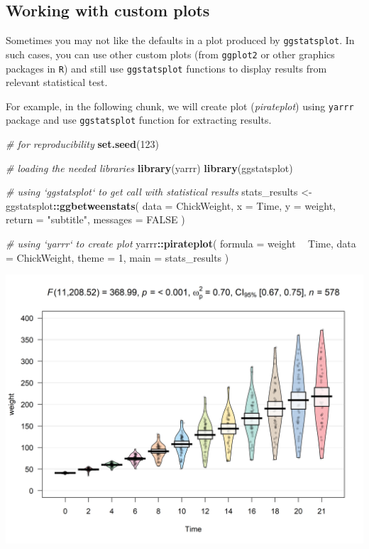 \documentclass[]{article}
\newenvironment{Shaded}{\begin{snugshade}}{\end{snugshade}}
\newcommand{\CommentTok}[1]{\textcolor[rgb]{0.56,0.35,0.01}{\textit{#1}}}
\newcommand{\DataTypeTok}[1]{\textcolor[rgb]{0.13,0.29,0.53}{#1}}
\newcommand{\DecValTok}[1]{\textcolor[rgb]{0.00,0.00,0.81}{#1}}
\newcommand{\KeywordTok}[1]{\textcolor[rgb]{0.13,0.29,0.53}{\textbf{#1}}}
\newcommand{\NormalTok}[1]{#1}
\newcommand{\OperatorTok}[1]{\textcolor[rgb]{0.81,0.36,0.00}{\textbf{#1}}}
\newcommand{\OtherTok}[1]{\textcolor[rgb]{0.56,0.35,0.01}{#1}}
\newcommand{\StringTok}[1]{\textcolor[rgb]{0.31,0.60,0.02}{#1}}
\begin{document}
\hypertarget{working-with-custom-plots}{%
\subsection{Working with custom plots}\label{working-with-custom-plots}}

Sometimes you may not like the defaults in a plot produced by
\texttt{ggstatsplot}. In such cases, you can use other custom plots
(from \texttt{ggplot2} or other graphics packages in \texttt{R}) and
still use \texttt{ggstatsplot} functions to display results from
relevant statistical test.

For example, in the following chunk, we will create plot
(\emph{pirateplot}) using \texttt{yarrr} package and use
\texttt{ggstatsplot} function for extracting results.

\begin{Shaded}
\begin{Highlighting}[]
\CommentTok{# for reproducibility}
\KeywordTok{set.seed}\NormalTok{(}\DecValTok{123}\NormalTok{)}

\CommentTok{# loading the needed libraries}
\KeywordTok{library}\NormalTok{(yarrr)}
\KeywordTok{library}\NormalTok{(ggstatsplot)}

\CommentTok{# using `ggstatsplot` to get call with statistical results}
\NormalTok{stats_results <-}
\StringTok{  }\NormalTok{ggstatsplot}\OperatorTok{::}\KeywordTok{ggbetweenstats}\NormalTok{(}
    \DataTypeTok{data =}\NormalTok{ ChickWeight,}
    \DataTypeTok{x =}\NormalTok{ Time,}
    \DataTypeTok{y =}\NormalTok{ weight,}
    \DataTypeTok{return =} \StringTok{"subtitle"}\NormalTok{,}
    \DataTypeTok{messages =} \OtherTok{FALSE}
\NormalTok{  )}

\CommentTok{# using `yarrr` to create plot}
\NormalTok{yarrr}\OperatorTok{::}\KeywordTok{pirateplot}\NormalTok{(}
  \DataTypeTok{formula =}\NormalTok{ weight }\OperatorTok{~}\StringTok{ }\NormalTok{Time,}
  \DataTypeTok{data =}\NormalTok{ ChickWeight,}
  \DataTypeTok{theme =} \DecValTok{1}\NormalTok{,}
  \DataTypeTok{main =}\NormalTok{ stats_results}
\NormalTok{)}
\end{Highlighting}
\end{Shaded}

\includegraphics[width=1\linewidth]{./figures/paper-pirateplot-1}
\end{document}
